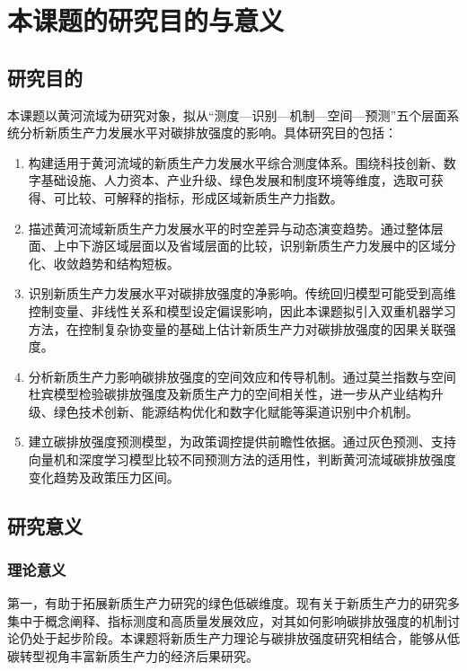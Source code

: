 \documentclass[UTF8,a4paper,zihao=-4,fontset=windows]{ctexart}
\newcommand{\regionscope}{黄河流域}
\begin{document}
\tableofcontents
\newpage

\section{本课题的研究目的与意义}

\subsection{研究目的}

本课题以\regionscope 为研究对象，拟从“测度—识别—机制—空间—预测”五个层面系统分析新质生产力发展水平对碳排放强度的影响。具体研究目的包括：

\begin{enumerate}[label=\arabic*.]
  \item 构建适用于\regionscope 的新质生产力发展水平综合测度体系。围绕科技创新、数字基础设施、人力资本、产业升级、绿色发展和制度环境等维度，选取可获得、可比较、可解释的指标，形成区域新质生产力指数。
  \item 描述\regionscope 新质生产力发展水平的时空差异与动态演变趋势。通过整体层面、上中下游区域层面以及省域层面的比较，识别新质生产力发展中的区域分化、收敛趋势和结构短板。
  \item 识别新质生产力发展水平对碳排放强度的净影响。传统回归模型可能受到高维控制变量、非线性关系和模型设定偏误影响，因此本课题拟引入双重机器学习方法，在控制复杂协变量的基础上估计新质生产力对碳排放强度的因果关联强度。
  \item 分析新质生产力影响碳排放强度的空间效应和传导机制。通过莫兰指数与空间杜宾模型检验碳排放强度及新质生产力的空间相关性，进一步从产业结构升级、绿色技术创新、能源结构优化和数字化赋能等渠道识别中介机制。
  \item 建立碳排放强度预测模型，为政策调控提供前瞻性依据。通过灰色预测、支持向量机和深度学习模型比较不同预测方法的适用性，判断\regionscope 碳排放强度变化趋势及政策压力区间。
\end{enumerate}

\subsection{研究意义}

\subsubsection{理论意义}

第一，有助于拓展新质生产力研究的绿色低碳维度。现有关于新质生产力的研究多集中于概念阐释、指标测度和高质量发展效应，对其如何影响碳排放强度的机制讨论仍处于起步阶段。本课题将新质生产力理论与碳排放强度研究相结合，能够从低碳转型视角丰富新质生产力的经济后果研究。
\end{document}
